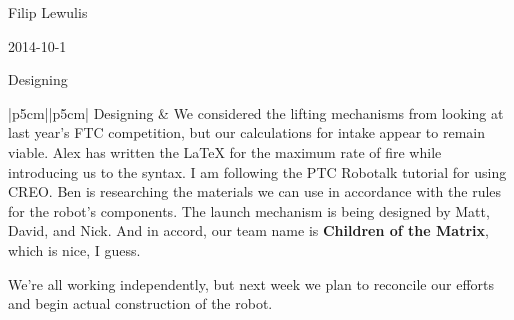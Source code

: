 Filip Lewulis

2014-10-1

Designing

\begin{tabular}{|p{5cm}|}{|p{5cm}|}
 \hline
 Designing
 &
 We considered the lifting mechanisms from looking at last year's FTC competition,
 but our calculations for intake appear to remain viable. Alex has written the LaTeX for
 the maximum rate of fire while introducing us to the syntax. I am following the PTC Robotalk
 tutorial for using CREO. Ben is researching the materials we can use in accordance with the
 rules for the robot's components. The launch mechanism is being designed by Matt, David, and Nick.
 And in accord, our team name is \textbf{Children of the Matrix}, which is nice, I guess. \\
 \hline
\end{tabular}
We're all working independently, but next week we plan to reconcile our efforts and begin
actual construction of the robot.
